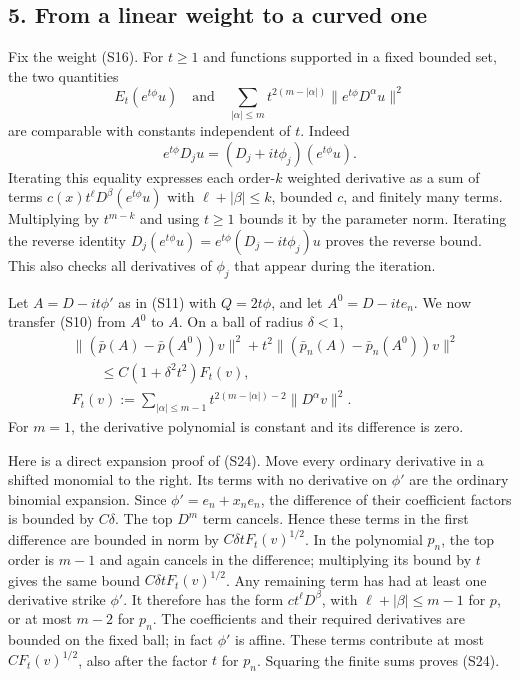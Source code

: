 \documentclass[
  11pt,
]{article}
\begin{document}
\subsection{5. From a linear weight to a curved
one}\label{from-a-linear-weight-to-a-curved-one}

Fix the weight (S16). For \(t\geq1\) and functions supported in a fixed
bounded set, the two quantities \[
 E_t(e^{t\phi}u)
 \quad\text{and}\quad
 \sum_{|\alpha|\leq m}t^{2(m-|\alpha|)}
                     \|e^{t\phi}D^\alpha u\|^2                  \tag{S23}
\] are comparable with constants independent of \(t\). Indeed \[
 e^{t\phi}D_ju=(D_j+it\phi_j)(e^{t\phi}u).
\] Iterating this equality expresses each order-\(k\) weighted
derivative as a sum of terms \(c(x)t^\ell D^\beta(e^{t\phi}u)\) with
\(\ell+|\beta|\leq k\), bounded \(c\), and finitely many terms.
Multiplying by \(t^{m-k}\) and using \(t\geq1\) bounds it by the
parameter norm. Iterating the reverse identity
\(D_j(e^{t\phi}u)=e^{t\phi}(D_j-it\phi_j)u\) proves the reverse bound.
This also checks all derivatives of \(\phi_j\) that appear during the
iteration.

Let \(A=D-it\phi'\) as in (S11) with \(Q=2t\phi\), and let
\(A^0=D-it e_n\). We now transfer (S10) from \(A^0\) to \(A\). On a ball
of radius \(\delta<1\), \[
\begin{split}
 &\|(\bar p(A)-\bar p(A^0))v\|^2
 +t^2\|(\bar p_n(A)-\bar p_n(A^0))v\|^2
 \\
 &\qquad\leq C(1+\delta^2t^2)F_t(v),\\
 &F_t(v):=\sum_{|\alpha|\leq m-1}
                t^{2(m-|\alpha|)-2}\|D^\alpha v\|^2.
\end{split}                                                       \tag{S24}
\] For \(m=1\), the derivative polynomial is constant and its difference
is zero.

Here is a direct expansion proof of (S24). Move every ordinary
derivative in a shifted monomial to the right. Its terms with no
derivative on \(\phi'\) are the ordinary binomial expansion. Since
\(\phi'=e_n+x_ne_n\), the difference of their coefficient factors is
bounded by \(C\delta\). The top \(D^m\) term cancels. Hence these terms
in the first difference are bounded in norm by
\(C\delta tF_t(v)^{1/2}\). In the polynomial \(p_n\), the top order is
\(m-1\) and again cancels in the difference; multiplying its bound by
\(t\) gives the same bound \(C\delta tF_t(v)^{1/2}\). Any remaining term
has had at least one derivative strike \(\phi'\). It therefore has the
form \(ct^\ell D^\beta\), with \(\ell+|\beta|\leq m-1\) for \(p\), or at
most \(m-2\) for \(p_n\). The coefficients and their required
derivatives are bounded on the fixed ball; in fact \(\phi'\) is affine.
These terms contribute at most \(CF_t(v)^{1/2}\), also after the factor
\(t\) for \(p_n\). Squaring the finite sums proves (S24).
\end{document}
